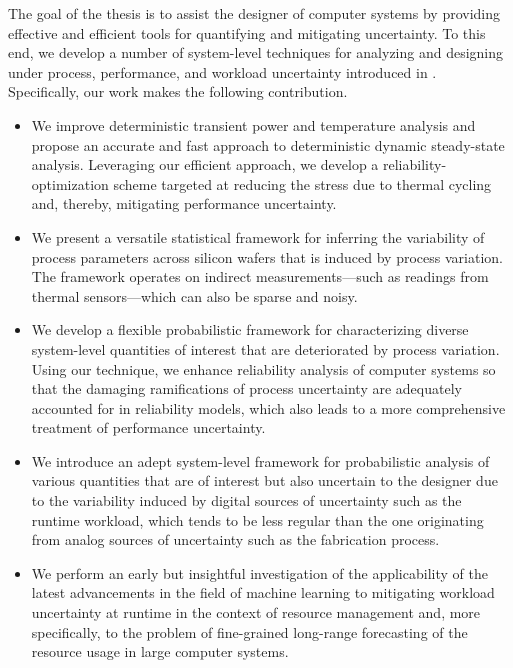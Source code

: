 The goal of the thesis is to assist the designer of computer systems by
providing effective and efficient tools for quantifying and mitigating
uncertainty. To this end, we develop a number of system-level techniques for
analyzing and designing under process, performance, and workload uncertainty
introduced in . Specifically, our work makes the following
contribution.

\begin{itemize}

\item
We improve deterministic transient power and temperature analysis and propose an
accurate and fast approach to deterministic dynamic steady-state analysis.
Leveraging our efficient approach, we develop a reliability-optimization scheme
targeted at reducing the stress due to thermal cycling \cite{jedec2016} and,
thereby, mitigating performance uncertainty.

\item
We present a versatile statistical framework for inferring the variability of
process parameters across silicon wafers that is induced by process variation.
The framework operates on indirect measurements---such as readings from thermal
sensors---which can also be sparse and noisy.

\item
We develop a flexible probabilistic framework for characterizing diverse
system-level quantities of interest that are deteriorated by process variation.
Using our technique, we enhance reliability analysis of computer systems so that
the damaging ramifications of process uncertainty are adequately accounted for
in reliability models, which also leads to a more comprehensive treatment of
performance uncertainty.

\item
We introduce an adept system-level framework for probabilistic analysis of
various quantities that are of interest but also uncertain to the designer due
to the variability induced by digital sources of uncertainty such as the runtime
workload, which tends to be less regular than the one originating from analog
sources of uncertainty such as the fabrication process.

\item
We perform an early but insightful investigation of the applicability of the
latest advancements in the field of machine learning to mitigating workload
uncertainty at runtime in the context of resource management and, more
specifically, to the problem of fine-grained long-range forecasting of the
resource usage in large computer systems.

\end{itemize}

